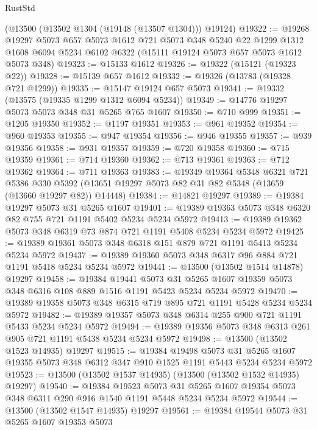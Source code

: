 \begin{lexlean}{RustStd}
\begin{coremodule}
    (@13500 (@13502 @1304 (@19148 (@13507 @1304))) @19124)
@19322 := @19268
    @19297
    @5073
    @657
    @5073
    @1612
    @721
    @5073
    @348
    @5240
    @22
    @1299
    @1312
    @1608
    @6094
    @5234
    @6102
    @6322
    (@15111 @19124 @5073 @657 @5073 @1612 @5073 @348)
@19323 := @15133 @1612
@19326 := @19322 (@15121 (@19323 @22))
@19328 := @15139 @657 @1612
@19332 := @19326 (@13783 (@19328 @721 @1299))
@19335 := @15147 @19124 @657 @5073
@19341 := @19332 (@13575 (@19335 @1299 @1312 @6094 @5234))
@19349 := @14776 @19297 @5073 @5073 @348 @31 @5265 @765 @1607
@19350 := @710 @999
@19351 := @1205 @19350
@19352 := @1197 @19351
@19353 := @961 @19352
@19354 := @960 @19353
@19355 := @947 @19354
@19356 := @946 @19355
@19357 := @939 @19356
@19358 := @931 @19357
@19359 := @720 @19358
@19360 := @715 @19359
@19361 := @714 @19360
@19362 := @713 @19361
@19363 := @712 @19362
@19364 := @711 @19363
@19383 := @19349
    @19364
    @5348
    @6321
    @721
    @5386
    @330
    @5392
    (@13651 @19297 @5073 @82 @31 @82 @5348 (@13659 (@13660 @19297 @82)) @14448)
@19384 := @14821 @19297
@19389 := @19384 @19297 @5073 @31 @5265 @1607
@19401 := @19389 @19363 @5073 @348 @6320 @82 @755 @721 @1191 @5402 @5234 @5234 @5972
@19413 := @19389 @19362 @5073 @348 @6319 @73 @874 @721 @1191 @5408 @5234 @5234 @5972
@19425 := @19389 @19361 @5073 @348 @6318 @151 @879 @721 @1191 @5413 @5234 @5234 @5972
@19437 := @19389 @19360 @5073 @348 @6317 @96 @884 @721 @1191 @5418 @5234 @5234 @5972
@19441 := @13500 (@13502 @1514 @14878) @19297
@19458 := @19384
    @19441
    @5073
    @31
    @5265
    @1607
    @19359
    @5073
    @348
    @6316
    @108
    @889
    @1516
    @1191
    @5423
    @5234
    @5234
    @5972
@19470 := @19389 @19358 @5073 @348 @6315 @719 @895 @721 @1191 @5428 @5234 @5234 @5972
@19482 := @19389 @19357 @5073 @348 @6314 @255 @900 @721 @1191 @5433 @5234 @5234 @5972
@19494 := @19389 @19356 @5073 @348 @6313 @261 @905 @721 @1191 @5438 @5234 @5234 @5972
@19498 := @13500 (@13502 @1523 @14935) @19297
@19515 := @19384
    @19498
    @5073
    @31
    @5265
    @1607
    @19355
    @5073
    @348
    @6312
    @347
    @910
    @1525
    @1191
    @5443
    @5234
    @5234
    @5972
@19523 := @13500 (@13502 @1537 @14935) (@13500 (@13502 @1532 @14935) @19297)
@19540 := @19384
    @19523
    @5073
    @31
    @5265
    @1607
    @19354
    @5073
    @348
    @6311
    @290
    @916
    @1540
    @1191
    @5448
    @5234
    @5234
    @5972
@19544 := @13500 (@13502 @1547 @14935) @19297
@19561 := @19384
    @19544
    @5073
    @31
    @5265
    @1607
    @19353
    @5073

\end{coremodule}
\end{lexlean}
